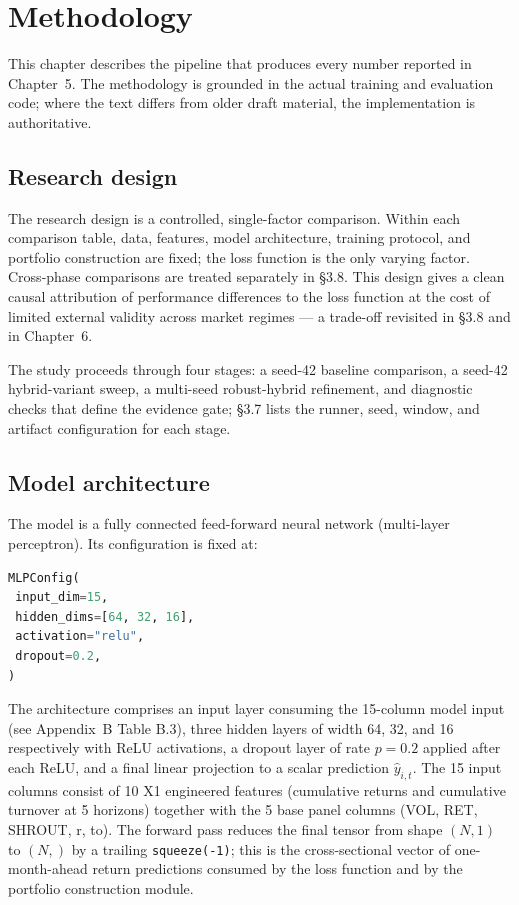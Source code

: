 \chapter{Methodology}

\label{ch:methodology}

This chapter describes the pipeline that produces every number reported in Chapter~5. The methodology is grounded in the actual training and evaluation code; where the text differs from older draft material, the implementation is authoritative.

\section{Research design}

\label{sec:research-design}

The research design is a controlled, single-factor comparison. Within each comparison table, data, features, model architecture, training protocol, and portfolio construction are fixed; the loss function is the only varying factor. Cross-phase comparisons are treated separately in \S3.8. This design gives a clean causal attribution of performance differences to the loss function at the cost of limited external validity across market regimes --- a trade-off revisited in \S3.8 and in Chapter~6.

The study proceeds through four stages: a seed-42 baseline comparison, a seed-42 hybrid-variant sweep, a multi-seed robust-hybrid refinement, and diagnostic checks that define the evidence gate; \S3.7 lists the runner, seed, window, and artifact configuration for each stage.

\section{Model architecture}

\label{sec:model-architecture}

The model is a fully connected feed-forward neural network (multi-layer perceptron). Its configuration is fixed at:

\begin{lstlisting}[language=Python]
MLPConfig(
 input_dim=15,
 hidden_dims=[64, 32, 16],
 activation="relu",
 dropout=0.2,
)
\end{lstlisting}

The architecture comprises an input layer consuming the 15-column model input (see Appendix~B Table B.3), three hidden layers of width 64, 32, and 16 respectively with ReLU activations, a dropout layer of rate $p = 0.2$ applied after each ReLU, and a final linear projection to a scalar prediction $\hat y_{i,t}$. The 15 input columns consist of 10 X1 engineered features (cumulative returns and cumulative turnover at 5 horizons) together with the 5 base panel columns (VOL, RET, SHROUT, r, to). The forward pass reduces the final tensor from shape $(N, 1)$ to $(N,)$ by a trailing \texttt{squeeze(-1)}; this is the cross-sectional vector of one-month-ahead return predictions consumed by the loss function and by the portfolio construction module.

